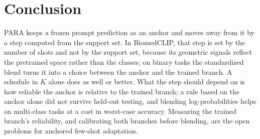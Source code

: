 \section{Conclusion}\label{sec:conclusion}
PARA keeps a frozen prompt prediction as an anchor and moves away from it by a step computed from the support set.
In BiomedCLIP, that step is set by the number of shots and not by the support set, because its geometric signals reflect the pretrained space rather than the classes;
on binary tasks the standardized blend turns it into a choice between the anchor and the trained branch.
A schedule in $K$ alone does as well or better.
What the step should depend on is how reliable the anchor is relative to the trained branch; a rule based on the anchor alone did not survive held-out testing,
and blending log-probabilities helps on multi-class tasks at a cost in worst-case accuracy.
Measuring the trained branch's reliability, and calibrating both branches before blending, are the open problems for anchored few-shot adaptation.
